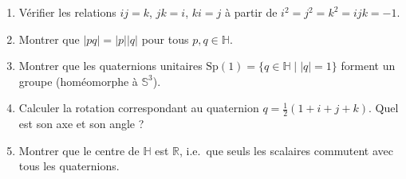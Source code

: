 \vspace{6pt}
\exolabel


\begin{mdframed}[style=exobar]
  \begin{enumerate}
    \item Vérifier les relations $ij=k$, $jk=i$, $ki=j$ à partir de $i^2=j^2=k^2=ijk=-1$.

    \item Montrer que $|pq|=|p||q|$ pour tous $p,q\in\mathbb{H}$.

    \item Montrer que les quaternions unitaires $\mathrm{Sp}(1) = \{q \in \mathbb{H} \mid |q|=1\}$
          forment un groupe (homéomorphe à $\mathbb{S}^3$).

    \item Calculer la rotation correspondant au quaternion $q = \tfrac{1}{2}(1+i+j+k)$.
          Quel est son axe et son angle ?

    \item Montrer que le centre de $\mathbb{H}$ est $\mathbb{R}$, i.e.\ que
          seuls les scalaires commutent avec tous les quaternions.
  \end{enumerate}
\end{mdframed}

